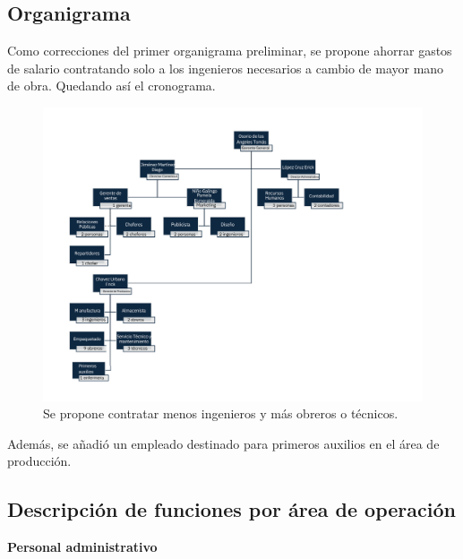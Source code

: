 \subsection{Organigrama}

Como correcciones del primer organigrama preliminar, se propone ahorrar gastos de salario contratando solo a los ingenieros necesarios a cambio de mayor mano de obra. Quedando así el cronograma.

\begin{figure}[H]
    \centering	
    \includegraphics[width=1.3\textwidth]{img/Empresa/ORGANIGRAMA.png} 
    \caption{Se propone contratar menos ingenieros y más obreros o técnicos.}
\label{fig:macrolocalizacion}
\end{figure}

Además, se añadió un empleado destinado para primeros auxilios en el área de producción.
\newpage

\subsection{Descripción de funciones por área de operación}
\textbf{Personal administrativo}

